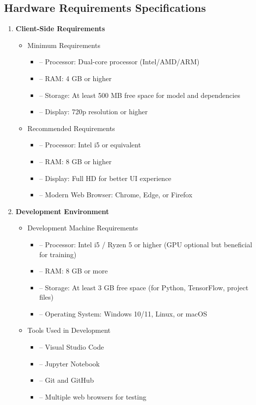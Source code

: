 \documentclass[12pt,a4paper]{report}
\begin{document}
\subsection{Hardware Requirements Specifications}
\begin{enumerate}
    \item \textbf{Client-Side Requirements}
    \begin{itemize}
        \item Minimum Requirements
        \begin{itemize}
            \item[] -- Processor: Dual-core processor (Intel/AMD/ARM)
            \item[] -- RAM: 4 GB or higher
            \item[] -- Storage: At least 500 MB free space for model and dependencies
            \item[] -- Display: 720p resolution or higher
        \end{itemize}
        \item Recommended Requirements
        \begin{itemize}
            \item[] -- Processor: Intel i5 or equivalent
            \item[] -- RAM: 8 GB or higher
            \item[] -- Display: Full HD for better UI experience
            \item[] -- Modern Web Browser: Chrome, Edge, or Firefox
        \end{itemize}
    \end{itemize}
    \item \textbf{Development Environment}
    \begin{itemize}
        \item Development Machine Requirements
        \begin{itemize}
            \item[] -- Processor: Intel i5 / Ryzen 5 or higher (GPU optional but beneficial for training)
            \item[] -- RAM: 8 GB or more
            \item[] -- Storage: At least 3 GB free space (for Python, TensorFlow, project files)
            \item[] -- Operating System: Windows 10/11, Linux, or macOS
        \end{itemize}
        \item Tools Used in Development
        \begin{itemize}
            \item[] -- Visual Studio Code
            \item[] -- Jupyter Notebook
            \item[] -- Git and GitHub
            \item[] -- Multiple web browsers for testing
        \end{itemize}
    \end{itemize}
\end{enumerate}
\end{document}
